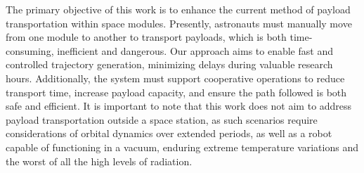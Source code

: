 The primary objective of this work is to enhance the current method of payload transportation within space modules. Presently, astronauts must manually move from one module to another to transport payloads, which is both time-consuming,  inefficient and dangerous. Our approach aims to enable fast and controlled trajectory generation, minimizing delays during valuable research hours. Additionally, the system must support cooperative operations to reduce transport time, increase payload capacity, and ensure the path followed is both safe and efficient. It is important to note that this work does not aim to address payload transportation outside a space station, as such scenarios require considerations of orbital dynamics over extended periods, as well as a robot capable of functioning in a vacuum, enduring extreme temperature variations and the worst of all the high levels of radiation.
